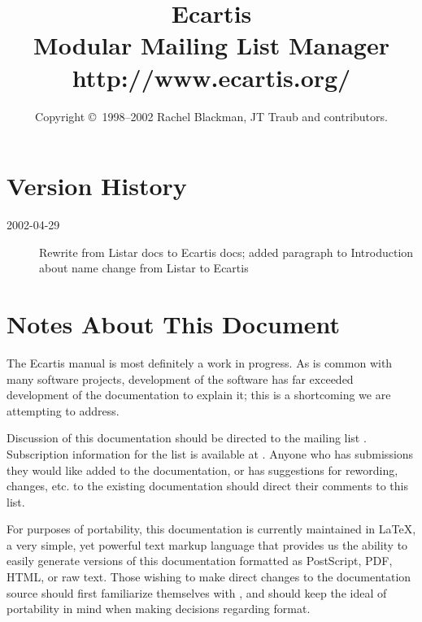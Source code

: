 \documentclass{book}
\begin{document}
\frontmatter

\title{Ecartis \\ Modular Mailing List Manager \\ http://www.ecartis.org/}
\author{Copyright \copyright\ 1998--2002 Rachel Blackman, JT Traub and contributors.}
\maketitle

\chapter{Version History}
\label{version}

\begin{description}
	\item[2002-04-29] Rewrite from Listar docs to Ecartis docs; added
                      paragraph to Introduction about name change from Listar
                      to Ecartis
\end{description}

\chapter{Notes About This Document}

The Ecartis manual is most definitely a work in progress.  As is common with
many software projects, development of the software has far exceeded
development of the documentation to explain it; this is a shortcoming we are
attempting to address.  

Discussion of this documentation should be directed to the mailing list 
.  Subscription information for the list is
available at .  Anyone who has submissions they
would like added to the documentation, or has suggestions for rewording,
changes, etc. to the existing documentation should direct their comments to
this list.

For purposes of portability, this documentation is currently maintained in
\LaTeX, a very simple, yet powerful text markup language that provides us the
ability to easily generate versions of this documentation formatted as
PostScript, PDF, HTML, or raw text.  Those wishing to make direct changes to
the documentation source should first familiarize themselves with \LaTeXe,
and should keep the ideal of portability in mind when making decisions
regarding format.
\end{document}
